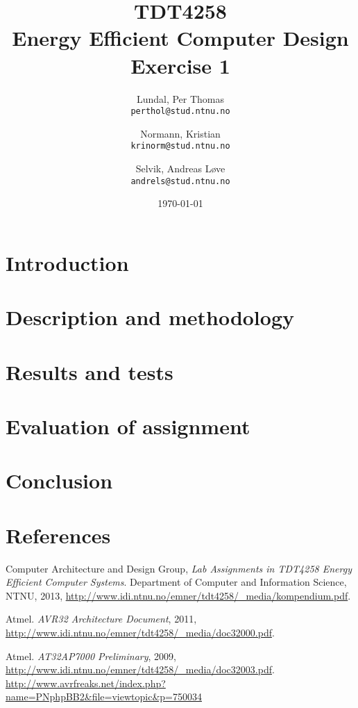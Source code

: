 \documentclass[a4paper,12pt]{article}
\title{TDT4258\\ Energy Efficient Computer Design
	\\Exercise 1}
\author{
    Lundal, Per Thomas\\
    \texttt{perthol@stud.ntnu.no}
    \and
    Normann, Kristian\\
    \texttt{krinorm@stud.ntnu.no}
    \and
    Selvik, Andreas Løve\\
    \texttt{andrels@stud.ntnu.no}
}
\date{\today}
\begin{document}
\maketitle

\clearpage
\begin{abstract}
    

\end{abstract}

\clearpage
\tableofcontents

\clearpage
\section{ Introduction}
    

\clearpage
\section{ Description and methodology}
    

\clearpage
\section{ Results and tests}
    

\clearpage
\section{ Evaluation of assignment}
    

\clearpage
\section{ Conclusion}
    

\clearpage
\section{References}

\begin{thebibliography}{9}

  Computer Architecture and Design Group,
  \emph{Lab Assignments in TDT4258 Energy Efficient
Computer Systems}.
  Department of Computer and Information Science, NTNU,
  2013,
  \url{http://www.idi.ntnu.no/emner/tdt4258/\_media/kompendium.pdf}.

  Atmel.
  \emph{AVR32 Architecture Document},
  2011,
  \url{http://www.idi.ntnu.no/emner/tdt4258/\_media/doc32000.pdf}.

  Atmel.
  \emph{AT32AP7000 Preliminary},
  2009,
  \url{http://www.idi.ntnu.no/emner/tdt4258/\_media/doc32003.pdf}.
  \url{http://www.avrfreaks.net/index.php?name=PNphpBB2&file=viewtopic&p=750034}

\end{thebibliography}
\end{document}
